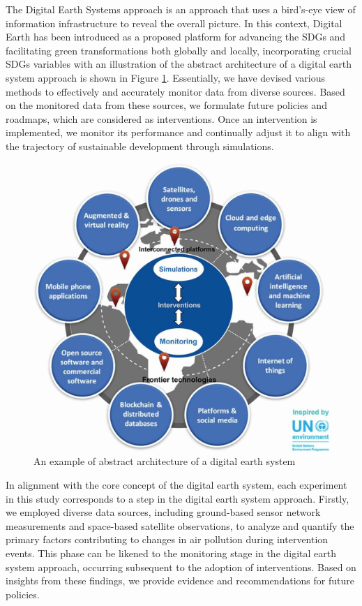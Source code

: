 The Digital Earth Systems approach is an approach that uses a bird's-eye view of information infrastructure to reveal the overall picture. In this context, Digital Earth has been introduced as a proposed platform for advancing the SDGs and facilitating green transformations both globally and locally, incorporating crucial SDGs variables \citep{fukui2021digital} with an illustration of the abstract architecture of a digital earth system approach is shown in Figure \ref{fig:chap2_fig7}. Essentially, we have devised various methods to effectively and accurately monitor data from diverse sources. Based on the monitored data from these sources, we formulate future policies and roadmaps, which are considered as interventions. Once an intervention is implemented, we monitor its performance and continually adjust it to align with the trajectory of sustainable development through simulations. \par
\begin{figure}[tbh!]
    \centering
    \includegraphics[width=\textwidth]{figs/chap2/digital_earth.jpg}
    \caption[An example of abstract architecture of a digital earth system]{An example of abstract architecture of a digital earth system \citep{fukui2021digital}}
    \label{fig:chap2_fig7}
\end{figure}

In alignment with the core concept of the digital earth system, each experiment in this study corresponds to a step in the digital earth system approach. Firstly, we employed diverse data sources, including ground-based sensor network measurements and space-based satellite observations, to analyze and quantify the primary factors contributing to changes in air pollution during intervention events. This phase can be likened to the monitoring stage in the digital earth system approach, occurring subsequent to the adoption of interventions. Based on insights from these findings, we provide evidence and recommendations for future policies. \par

